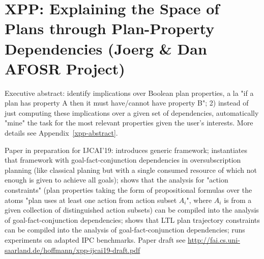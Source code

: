 \section{XPP: Explaining the Space of Plans through Plan-Property Dependencies (Joerg \& Dan AFOSR Project)}
\label{xpp}

Executive abstract: identify implications over Boolean plan
properties, a la "if a plan has property A then it must have/cannot
have property B"; 2) instead of just computing these implications over
a given set of dependencies, automatically "mine" the task for the
most relevant properties given the user's interests. More details see
Appendix~\ref{xpp-abstract}.

Paper in preparation for IJCAI'19: introduces generic framework;
instantiates that framework with goal-fact-conjunction dependencies in
oversubscription planning (like classical planing but with a single
consumed resource of which not enough is given to achieve all goals);
shows that the analysis for "action constraints" (plan properties
taking the form of propositional formulas over the atoms "plan uses at
least one action from action subset $A_i$", where $A_i$ is from a
given collection of distinguished action subsets) can be compiled into
the analysis of goal-fact-conjunction dependencies; shows that LTL
plan trajectory constraints can be compiled into the analysis of
goal-fact-conjunction dependencies; runs experiments on adapted IPC
benchmarks. Paper draft see
\url{http://fai.cs.uni-saarland.de/hoffmann/xpp-ijcai19-draft.pdf}












